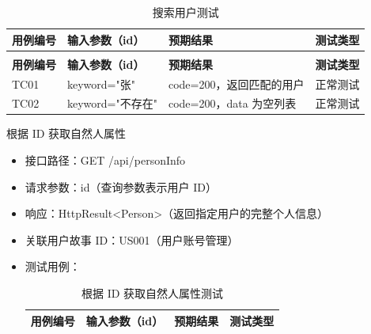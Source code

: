 \begin{levellist}
\begin{levellist}
\begin{itemize}
\begin{longtable}{>{\centering\arraybackslash}m{1.7cm} >{\centering\arraybackslash}m{4cm} >{\centering\arraybackslash}m{5.3cm} >{\centering\arraybackslash}m{2cm}}
                      \caption{搜索用户测试} \label{tab:training}                                  \\

                      \toprule
                      \textbf{用例编号} & \textbf{输入参数（id）} & \textbf{预期结果}      & \textbf{测试类型} \\
                      \midrule
                      \endfirsthead

                      \multicolumn{4}{c}{{\tablename\ \thetable{} 续表}}                       \\
                      \toprule
                      \textbf{用例编号} & \textbf{输入参数（id）} & \textbf{预期结果}      & \textbf{测试类型} \\
                      \midrule
                      \endhead

                      \bottomrule
                      \endfoot

                      TC01          & keyword="张"       & code=200，返回匹配的用户   & 正常测试          \\
                      TC02          & keyword="不存在"     & code=200，data 为空列表 & 正常测试          \\
                  \end{longtable}
        \end{itemize}

        \item 根据 ID 获取自然人属性
        \begin{itemize}
            \item 接口路径：GET /api/personInfo
            \item 请求参数：id（查询参数表示用户 ID）
            \item 响应：HttpResult<Person>（返回指定用户的完整个人信息）
            \item 关联用户故事 ID：US001（用户账号管理）
            \item 测试用例：
                  \begin{longtable}{>{\centering\arraybackslash}m{1.7cm} >{\centering\arraybackslash}m{3.3cm} >{\centering\arraybackslash}m{6cm} >{\centering\arraybackslash}m{2cm}}

                      \caption{根据 ID 获取自然人属性测试} \label{tab:training}                           \\

                      \toprule
                      \textbf{用例编号} & \textbf{输入参数（id）} & \textbf{预期结果}        & \textbf{测试类型} \\
                      \midrule
                      \endfirsthead


\end{longtable}
\end{itemize}
\end{levellist}
\end{levellist}
